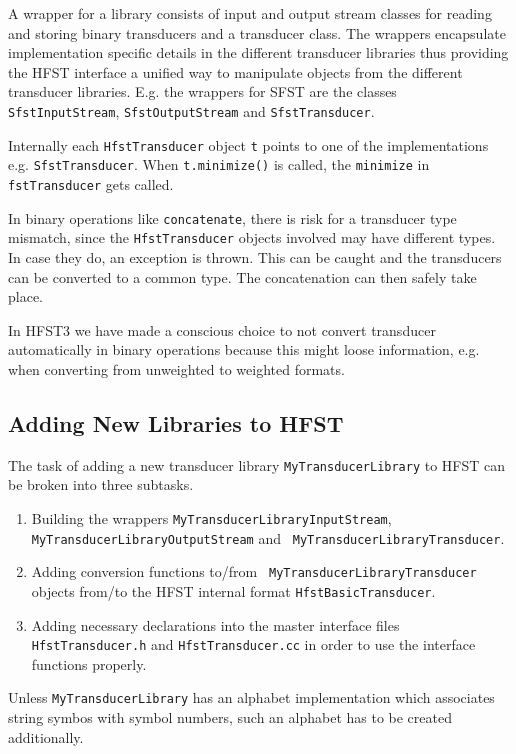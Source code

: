 \documentclass{llncs}
\begin{document}
A wrapper for a library consists of input and output stream classes
for reading and storing binary transducers and a transducer class. The
wrappers encapsulate implementation specific details in the different
transducer libraries thus providing the HFST interface a unified way
to manipulate objects from the different transducer
libraries. E.g. the wrappers for SFST are the classes {\tt
  SfstInputStream}, {\tt SfstOutputStream} and {\tt SfstTransducer}.

Internally each {\tt HfstTransducer} object {\tt t} points to one of
the implementations e.g. {\tt SfstTransducer}. When {\tt t.minimize()}
is called, the {\tt minimize} in {\tt fstTransducer} gets called. 

In binary operations like {\tt concatenate}, there is risk for a
transducer type mismatch, since the {\tt HfstTransducer} objects
involved may have different types. In case they do, an exception is
thrown. This can be caught and the transducers can be converted to a
common type. The concatenation can then safely take place.

In HFST3 we have made a conscious choice to not convert transducer
automatically in binary operations because this might loose
information, e.g. when converting from unweighted to weighted formats.

\subsection{Adding New Libraries to HFST}

The task of adding a new transducer library {\tt MyTransducerLibrary} to HFST can be broken into three subtasks.

\begin{enumerate}
\item Building the wrappers {\tt MyTransducerLibraryInputStream}, {\tt
  MyTransducerLibraryOutputStream} and {\tt
  MyTransducerLibraryTransducer}.
\item Adding conversion functions to/from {\tt
  MyTransducerLibraryTransducer} objects from/to the HFST internal
  format {\tt HfstBasicTransducer}.
\item Adding necessary declarations into the master interface files
  {\tt HfstTransducer.h} and {\tt HfstTransducer.cc} in order to use
  the interface functions properly.
\end{enumerate} 

Unless {\tt MyTransducerLibrary} has an alphabet implementation which
associates string symbos with symbol numbers, such an alphabet has to
be created additionally.
\end{document}
